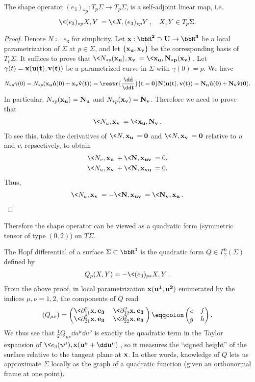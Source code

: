 \begin{lem}
    The shape operator $(e_3)_{\ast p}:T_p\Sigma\to T_p\Sigma$, is a self-adjoint linear map, i.e.\ 
    \[\<(e_3)_{\ast p}X,Y\>=\<X,(e_3)_{\ast p}Y\>,\quad X,Y\in T_p\Sigma.\]
\end{lem}
\begin{proof}
    Denote $N\coloneqq e_3$ for simplicity. Let $\bf{x}:\bbR^2\supset U\to \bbR^3$ be a local parametrization of $\Sigma$ at $p\in\Sigma$, and let $\{\bf{x}_u, \bf{x}_v\}$ be the corresponding basis of $T_p\Sigma$. It suffices to prove that $\<N_{\ast p}(\bf{x}_u),\bf{x}_v\>=\<\bf{x}_u,N_{\ast p}(\bf{x}_v)\>$. Let $\gamma(t)=\bf{x}(u(t),v(t))$ be a parametrized curve in $\Sigma$ with $\gamma(0)=p$. We have 
    \[N_{\ast p}\dot\gamma(0)=N_{\ast p}(\bf{x}_u \dot u(0)+\bf{x}_v \dot v(t))=\restr{\frac{\dd}{\dd t}}{t=0}N(u(t),v(t))=N_u \dot u(0)+N_v\dot v(0).\]
    In particular, $N_{\ast p}(\bf{x}_u)=N_u$ and $N_{\ast p}(\bf{x}_v)=N_v$. Therefore we need to prove that 
    \[\<N_u,\bf{x}_v\>=\<\bf{x}_u,N_v\>.\]
    To see this, take the derivatives of $\<N,\bf{x}_u\>=0$ and $\<N,\bf{x}_v\>=0$ relative to $u$ and $v$, repsectively, to obtain 
    \begin{align}
        \<N_v,\bf{x}_u\>+\<N,\bf{x}_{uv}\>&=0,\\
        \<N_u,\bf{x}_v\>+\<N,\bf{x}_{vu}\>&=0.
    \end{align}
    Thus, 
    \[\<N_u,\bf{x}_v\>=-\<N,\bf{x}_{uv}\>=\<N_v,\bf{x}_u\>.\]
\end{proof}

Therefore the shape operator can be viewed as a quadratic form (symmetric tensor of type $(0,2)$) on $T\Sigma$.

\begin{defn}
    The Hopf differential of a surface $\Sigma\subset\bbR^3$ is the quadratic form $Q\in\Gamma^0_2(\Sigma)$ defined by 
    \[Q_p(X,Y)=-\<(e_3)_{p\ast}X,Y\>.\]
    From the above proof, in local parametrization $\bf{x}(u^1,u^2)$ enumerated by the indices $\mu,\nu=1,2$, the components of $Q$ read 
    \[(Q_{\mu\nu})=
    \begin{pmatrix}
        \<\partial^2_{11}\bf{x},e_3\>& \<\partial^2_{12}\bf{x},e_3\>\\
        \<\partial^2_{21}\bf{x},e_3\> & \<\partial^2_{22}\bf{x},e_3\>
    \end{pmatrix}
    \eqqcolon\begin{pmatrix}
        e&f\\
        g&h
    \end{pmatrix}.\label{eq hopf differential components}
    \]
    We thus see that $\frac12Q_{\mu\nu}\dd u^\mu \dd u^\nu$ is exactly the quadratic term in the Taylor expansion of $\<e_3(u^\mu),\bf{x}(u^\mu+\dd u^\mu)\>$, so it measures the ``signed height'' of the surface relative to the tangent plane at $\bf{x}$. In other words, knowledge of $Q$ lets us approximate $\Sigma$ locally as the graph of a quadratic function (given an orthonormal frame at one point).
\end{defn}

